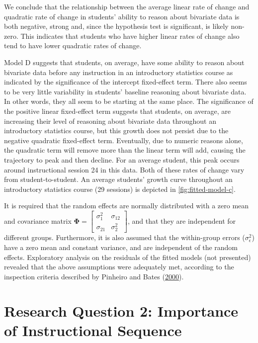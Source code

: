 \documentclass[11pt]{umnthesis}
\begin{document}
We conclude that the relationship between the average linear rate of change and quadratic rate of change in students' ability to reason about bivariate data is both negative, strong and, since the hypothesis test is significant, is likely non-zero. This indicates that students who have higher linear rates of change also tend to have lower quadratic rates of change.

Model D suggests that students, on average, have some ability to reason about bivariate data before any instruction in an introductory statistics course as indicated by the significance of the intercept fixed-effect term. There also seems to be very little variability in students' baseline reasoning about bivariate data. In other words, they all seem to be starting at the same place. The significance of the positive linear fixed-effect term suggests that students, on average, are increasing their level of reasoning about bivariate data throughout an introductory statistics course, but this growth does not persist due to the negative quadratic fixed-effect term. Eventually, due to numeric reasons alone, the quadratic term will remove more than the linear term will add, causing the trajectory to peak and then decline. For an average student, this peak occurs around instructional session 24 in this data. Both of these rates of change vary from student-to-student. An average students' growth curve throughout an introductory statistics course (29 sessions) is depicted in \ref{fig:fitted-model-c}.

It is required that the random effects are normally distributed with a zero mean and covariance matrix \(\boldsymbol\Phi=\begin{bmatrix}\sigma^2_{1} & \sigma_{12} \\ \sigma_{21} & \sigma^2_{2}\end{bmatrix}\), and that they are independent for different groups. Furthermore, it is also assumed that the within-group errors (\(\sigma^2_{\epsilon}\)) have a zero mean and constant variance, and are independent of the random effects. Exploratory analysis on the residuals of the fitted models (not presented) revealed that the above assumptions were adequately met, according to the inspection criteria described by Pinheiro and Bates (\protect\hyperlink{ref-pinheiro:2000}{2000}).

\hypertarget{research-question-2-importance-of-instructional-sequence}{%
\section{Research Question 2: Importance of Instructional Sequence}\label{research-question-2-importance-of-instructional-sequence}}
\end{document}
